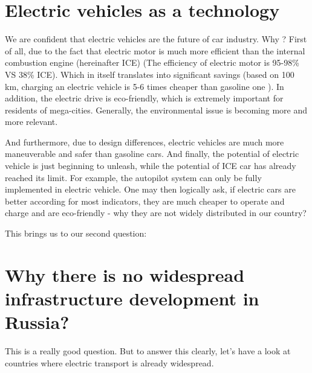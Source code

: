 \documentclass[a4paper,12pt]{report}
\begin{document}
\chapter{Electric vehicles as a technology}
\label{chapter3}
We are confident that electric vehicles are the future of  car  industry. Why ? First of all, due to the fact that  electric motor is much more efficient than the  internal combustion engine (hereinafter ICE) (The efficiency of  electric motor is 95-98\% VS  38\% ICE). Which in itself translates into significant savings (based on 100 km, charging an electric vehicle is 5-6 times cheaper than gasoline one ). In addition, the electric drive is eco-friendly, which is extremely important for residents of mega-cities.  Generally, the  environmental issue is becoming more and more relevant.

And furthermore,  due to design differences, electric vehicles are much more maneuverable and safer than  gasoline cars. And finally, the potential of electric vehicle  is just beginning to unleash, while  the potential of ICE car has already reached its limit. For example, the autopilot system can only be fully implemented in  electric vehicle.
One may then logically ask,  if electric cars are better  according for most indicators, they are much cheaper to operate and charge and are eco-friendly - why they are not widely distributed in our country?

This brings us to our second question:


\chapter{Why  there is  no widespread  infrastructure development in Russia?}
This is a really good question. But to answer this clearly, let's  have a look at countries where electric transport is already widespread.
\end{document}
